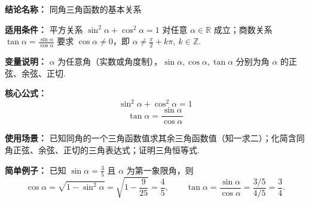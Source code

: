 \textbf{结论名称：} 同角三角函数的基本关系

\textbf{适用条件：} 
平方关系 \(\sin^2\alpha+\cos^2\alpha=1\) 对任意 \(\alpha\in\mathbb{R}\) 成立；商数关系 \(\tan\alpha=\frac{\sin\alpha}{\cos\alpha}\) 要求 \(\cos\alpha\neq0\)，即 \(\alpha\neq\frac{\pi}{2}+k\pi,\ k\in\mathbb{Z}\).

\textbf{变量说明：} 
\(\alpha\) 为任意角（实数或角度制），\(\sin\alpha,\cos\alpha,\tan\alpha\) 分别为角 \(\alpha\) 的正弦、余弦、正切.

\textbf{核心公式：} 
\[ \boxed{\sin^2\alpha + \cos^2\alpha = 1} \]
\[ \boxed{\tan\alpha = \frac{\sin\alpha}{\cos\alpha}} \]

\textbf{使用场景：} 
已知同角的一个三角函数值求其余三角函数值（知一求二）；化简含同角正弦、余弦、正切的三角表达式；证明三角恒等式.

\textbf{简单例子：} 
已知 \(\sin\alpha = \frac{3}{5}\) 且 \(\alpha\) 为第一象限角，则
\[ \cos\alpha = \sqrt{1-\sin^2\alpha} = \sqrt{1-\frac{9}{25}} = \frac{4}{5}, \qquad \tan\alpha = \frac{\sin\alpha}{\cos\alpha} = \frac{3/5}{4/5} = \frac{3}{4}. \]